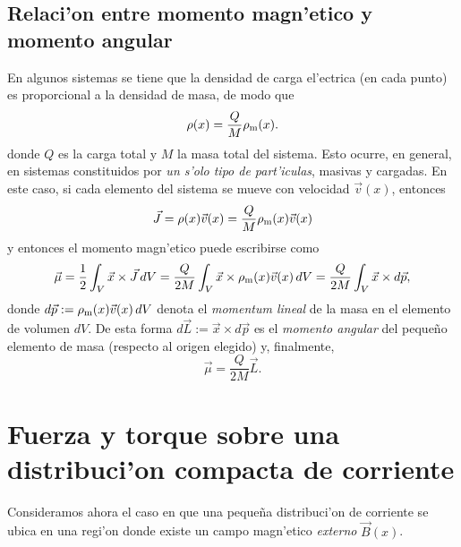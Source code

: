 \subsection{Relaci'on entre momento magn'etico y momento angular}
En algunos sistemas se tiene que la densidad de carga el'ectrica (en cada
punto) es proporcional a la densidad de masa, de modo que
\begin{equation}
 \rho(x)=\frac{Q}{M} \rho_{\rm m}(x).
\end{equation}
donde $Q$ es la carga total y $M$ la masa total del sistema. Esto ocurre, en
general, en sistemas constituidos por \textit{un s'olo tipo de part'iculas},
masivas y cargadas. En este caso, si cada elemento del sistema se mueve
con velocidad $\vec{v}(x)$, entonces
\begin{equation}
\vec{J}=\rho(x)\vec{v}(x)=\frac{Q}{M} \rho_{\rm m}(x)\vec{v}(x)
\end{equation}
y entonces el momento magn'etico puede escribirse como
\begin{equation}
 \vec{\mu}=\frac{1}{2}\int_V \vec{x}\times\vec{J}\,dV=\frac{Q}{2M}\int_V
\vec{x}\times\rho_{\rm m}(x)\vec{v}(x)\,dV=\frac{Q}{2M}\int_V
\vec{x}\times d\vec{p},
\end{equation}
donde $d\vec{p}:=\rho_{\rm m}(x)\vec{v}(x)\,dV$ denota el \textit{momentum lineal} de la masa en el elemento de volumen $dV$. De esta forma $d\vec{L}:=\vec{x}\times d\vec{p}$ es el \textit{momento angular} del peque\~no elemento de masa (respecto al origen elegido) y, finalmente,
\begin{equation}
 \boxed{\vec{\mu}=\frac{Q}{2M}\vec{L}.}
\end{equation}

\section{Fuerza y torque sobre una distribuci'on compacta de corriente}
Consideramos ahora el caso en que una peque\~na distribuci'on de corriente
se ubica en una regi'on donde existe un campo magn'etico \textit{externo}
$\vec{B}(x)$.

